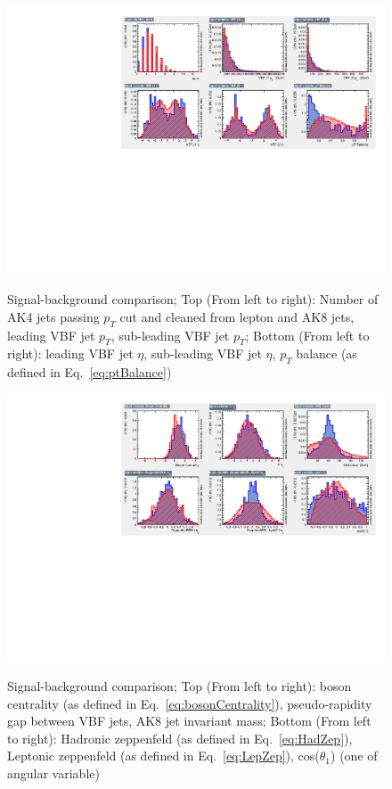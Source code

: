 \begin{figure}[h!]\ContinuedFloat
	 {\includegraphics[scale=0.85]{Plots/BDT_Performance/Trial1/dataset/plots/canvas3.pdf}}
	 \caption{Signal-background comparison; Top (From left to right): Number of AK4 jets passing $p_T$ cut and cleaned from lepton and AK8 jets, leading VBF jet $p_T$, sub-leading VBF jet $p_T$; Bottom (From left to right): leading VBF jet $\eta$, sub-leading VBF jet $\eta$, $p_T$ balance (as defined in Eq.~\ref{eq:ptBalance})}
\end{figure}
\begin{figure}[h!]\ContinuedFloat
	 {\includegraphics[scale=0.85]{Plots/BDT_Performance/Trial1/dataset/plots/canvas4.pdf}}
	 \caption{Signal-background comparison; Top (From left to right): boson centrality (as defined in Eq.~\ref{eq:bosonCentrality}), pseudo-rapidity gap between VBF jets, AK8 jet invariant mass; Bottom (From left to right): Hadronic zeppenfeld (as defined in Eq.~\ref{eq:HadZep}), Leptonic zeppenfeld (as defined in Eq.~\ref{eq:LepZep}), cos($\theta_1$) (one of angular variable)}
\end{figure}
